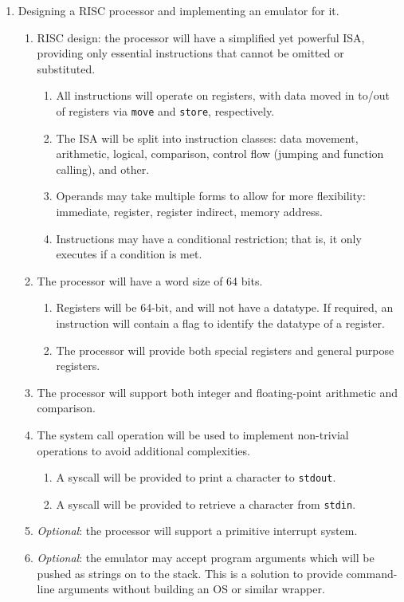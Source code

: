 \documentclass{article}
\begin{document}
    \begin{enumerate}
        \item Designing a RISC processor and implementing an emulator for it.
        \begin{enumerate}
            \item RISC design: the processor will have a simplified yet powerful ISA, providing only essential instructions that cannot be omitted or substituted.
            \begin{enumerate}
                \item All instructions will operate on registers, with data moved in to/out of registers via \texttt{move} and \texttt{store}, respectively.
                \item The ISA will be split into instruction classes: data movement, arithmetic, logical, comparison, control flow (jumping and function calling), and other.
                \item Operands may take multiple forms to allow for more flexibility: immediate, register, register indirect, memory address.
                \item Instructions may have a conditional restriction; that is, it only executes if a condition is met.
            \end{enumerate}
            \item The processor will have a word size of 64 bits.
            \begin{enumerate}
                \item Registers will be 64-bit, and will not have a datatype.
                If required, an instruction will contain a flag to identify the datatype of a register.
                \item The processor will provide both special registers and general purpose registers.
            \end{enumerate}
            \item The processor will support both integer and floating-point arithmetic and comparison.
            \item The system call operation will be used to implement non-trivial operations to avoid additional complexities.
            \begin{enumerate}
                \item A syscall will be provided to print a character to \texttt{stdout}.
                \item A syscall will be provided to retrieve a character from \texttt{stdin}.
            \end{enumerate}
            \item \textit{Optional}: the processor will support a primitive interrupt system.
            \item \textit{Optional}: the emulator may accept program arguments which will be pushed as strings on to the stack.
            This is a solution to provide command-line arguments without building an OS or similar wrapper.
        \end{enumerate}


\end{enumerate}
\end{document}
